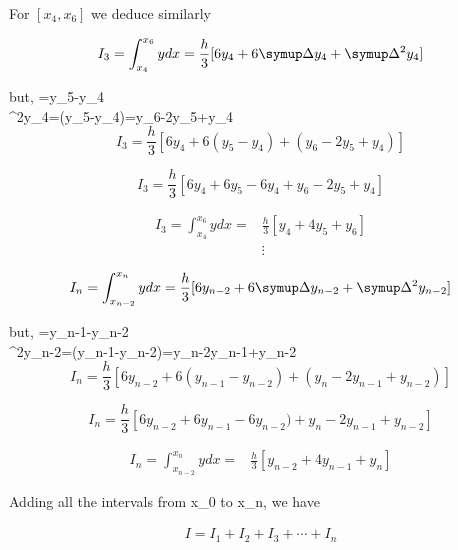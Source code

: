 \documentclass[a4paper,12pt]{report}
\numberwithin{equation}{section}
\begin{document}
For $[x_4,x_6]$ we deduce similarly

\begin{equation*}
I_3=\int_{x_4}^{x_6}ydx=\frac{h}{3}[6y_4+6\symup\Delta{y_4}+\symup\Delta^2{y_4}]
\end{equation*}

but, \symup{}=y_5-y_4\\
 \symup\Delta^2{y_4}=\symup\Delta(y_5-y_4)=y_6-2y_5+y_4\\

\begin{equation*}
I_3=\frac{h}{3}[6y_4+6(y_5-y_4)+(y_6-2y_5+y_4)]
\end{equation*}

\begin{equation*}
I_3=\frac{h}{3}[6y_4+6y_5-6y_4+y_6-2y_5+y_4]
\end{equation*}

\newpage
\begin{align*}
I_3=\int_{x_4}^{x_6}ydx=&\frac{h}{3}[y_4+4y_5+y_6]\\
 &\vdots
\end{align*}

\begin{equation*}
I_n=\int_{x_{n-2}}^{x_n}ydx=\frac{h}{3}[6y_{n-2}+6\symup\Delta{y_{n-2}}+\symup\Delta^2{y_{n-2}}]
\end{equation*}

but, \symup{}=y_{n-1}-y_{n-2}\\
 \symup\Delta^2{y_{n-2}}=\symup\Delta(y_{n-1}-y_{n-2})=y_n-2y_{n-1}+y_{n-2}\\

\begin{equation*}
I_n=\frac{h}{3}[6y_{n-2}+6(y_{n-1}-y_{n-2})+(y_n-2y_{n-1}+y_{n-2})]
\end{equation*}

\begin{equation*}
I_n=\frac{h}{3}[6y_{n-2}+6y_{n-1}-6y_{n-2})+y_n-2y_{n-1}+y_{n-2}]
\end{equation*}

\begin{align*}
I_n=\int_{x_{n-2}}^{x_n}ydx=&\frac{h}{3}[y_{n-2}+4y_{n-1}+y_n]
\end{align*}

Adding all the intervals from x_0 to x_n, we have

\begin{align*}
I=I_1+I_2+I_3+\cdots+I_n
\end{align*}
\end{document}
